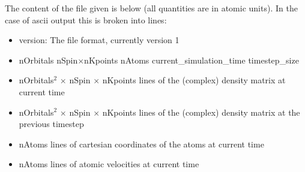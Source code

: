 The content of the file given is below (all quantities are in
atomic units). In the case of ascii output this is broken into lines:

\begin{itemize}
\item version: The file format, currently version 1
\item nOrbitals nSpin$\times$nKpoints nAtoms current\_simulation\_time timestep\_size
\item nOrbitals$^2$ $\times$ nSpin $\times$ nKpoints lines of the (complex)
  density matrix at current time
\item nOrbitals$^2$ $\times$ nSpin $\times$ nKpoints lines of the (complex)
  density matrix at the previous timestep
\item nAtoms lines of cartesian coordinates of the atoms at current time
\item nAtoms lines of atomic velocities at current time
\end{itemize}
